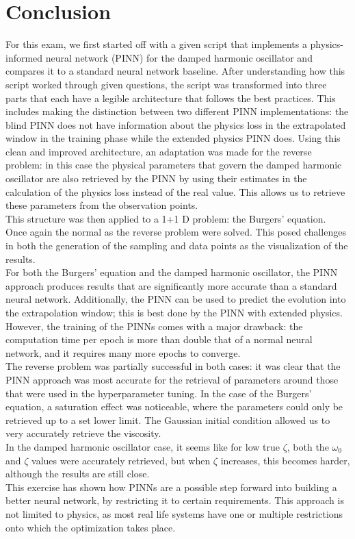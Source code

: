 \documentclass[12pt, a4paper]{report}
\begin{document}
\chapter{Conclusion}
For this exam, we first started off with a given script that implements a physics-informed neural network (PINN) for the damped harmonic oscillator and compares it to a standard neural network baseline. After understanding how this script worked through given questions, the script was transformed into three parts that each have a legible architecture that follows the best practices. This includes making the distinction between two different PINN implementations: the blind PINN does not have information about the physics loss in the extrapolated window in the training phase while the extended physics PINN does. Using this clean and improved architecture, an adaptation was made for the reverse problem: in this case the physical parameters that govern the damped harmonic oscillator are also retrieved by the PINN by using their estimates in the calculation of the physics loss instead of the real value. This allows us to retrieve these parameters from the observation points.\\
This structure was then applied to a 1+1 D problem: the Burgers' equation. Once again the normal as the reverse problem were solved. This posed challenges in both the generation of the sampling and data points as the visualization of the results.\\
For both the Burgers' equation and the damped harmonic oscillator, the PINN approach produces results that are significantly more accurate than a standard neural network. Additionally, the PINN can be used to predict the evolution into the extrapolation window; this is best done by the PINN with extended physics. However, the training of the PINNs comes with a major drawback: the computation time per epoch is more than double that of a normal neural network, and it requires many more epochs to converge.\\
The reverse problem was partially successful in both cases: it was clear that the PINN approach was most accurate for the retrieval of parameters around those that were used in the hyperparameter tuning. In the case of the Burgers' equation, a saturation effect was noticeable, where the parameters could only be retrieved up to a set lower limit. The Gaussian initial condition allowed us to very accurately retrieve the viscosity.\\
In the damped harmonic oscillator case, it seems like for low true $\zeta$, both the $\omega_0$ and $\zeta$ values were accurately retrieved, but when $\zeta$ increases, this becomes harder, although the results are still close. \\
This exercise has shown how PINNs are a possible step forward into building a better neural network, by restricting it to certain requirements. This approach is not limited to physics, as most real life systems have one or multiple restrictions onto which the optimization takes place.
\end{document}
